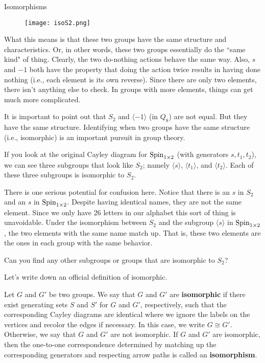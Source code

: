 \begin{section}{Isomorphisms}
\begin{figure}\label{fig:isoS2}
\begin{center}
\texttt{[image: isoS2.png]}
\end{center}
\end{figure}

What this means is that these two groups have the same structure and characteristics.  Or, in other words, these two groups essentially do the ``same kind" of thing.  Clearly, the two do-nothing actions behave the same way.  Also, \(s\) and \(-1\) both have the property that doing the action twice results in having done nothing (i.e., each element is its own reverse).  Since there are only two elements, there isn't anything else to check.  In groups with more elements, things can get much more complicated.  

It is important to point out that \(S_2\) and \(\langle -1\rangle\) (in \(Q_8\)) are not equal.  But they have the same structure.  Identifying when two groups have the same structure (i.e., isomorphic) is an important pursuit in group theory.

If you look at the original Cayley diagram for \(\operatorname{Spin}_{1\times 2}\) (with generators \(s, t_1, t_2\)), we can see three subgroups that look like \(S_2\); namely \(\langle s\rangle\), \(\langle t_1\rangle\), and \(\langle t_2\rangle\).  Each of these three subgroups is isomorphic to \(S_2\).  

There is one serious potential for confusion here.  Notice that there is an \(s\) in \(S_2\) and an \(s\) in \(\operatorname{Spin}_{1\times 2}\).  Despite having identical names, they are not the same element.  Since we only have 26 letters in our alphabet this sort of thing is unavoidable.  Under the isomorphism between \(S_2\) and the subgroup \(\langle s\rangle\) in \(\operatorname{Spin}_{1\times 2}\), the two elements with the same name match up.  That is, these two elements are the ones in each group with the same behavior.

\begin{exercise}
Can you find any other subgroups or groups that are isomorphic to \(S_2\)?
\end{exercise}

Let's write down an official definition of isomorphic.

\begin{definition}
Let \(G\) and \(G'\) be two groups.  We say that \(G\) and \(G'\) are \textbf{isomorphic} if there exist generating sets \(S\) and \(S'\) for \(G\) and \(G'\), respectively, such that the corresponding Cayley diagrams are identical where we ignore the labels on the vertices and recolor the edges if necessary.  In this case, we write \(G\cong G'\).  Otherwise, we say that \(G\) and \(G'\) are not isomorphic.  If \(G\) and \(G'\) are isomorphic, then the one-to-one correspondence determined by matching up the corresponding generators and respecting arrow paths is called an \textbf{isomorphism}.
\end{definition}


\end{section}
